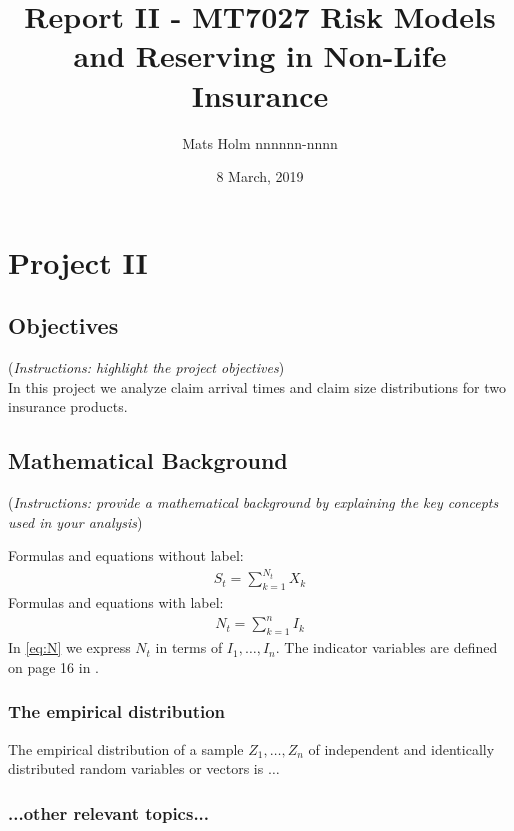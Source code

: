 \documentclass[11pt]{article}
\title{Report II - MT7027 Risk Models and Reserving in Non-Life Insurance}
\author{Mats Holm nnnnnn-nnnn }
\date{8 March, 2019}                                           %
\begin{document}
\maketitle
\section*{Project II}
\subsection*{Objectives}
({\it Instructions: highlight the project objectives})
\\
In this project we analyze claim
arrival times and claim size distributions for two insurance products.

\subsection*{Mathematical Background}
({\it Instructions: provide a mathematical background by explaining the key concepts used in your analysis})

Formulas and equations without label:
\begin{align*}
	S_t = \sum_{k=1}^{N_t} X_k
\end{align*}
Formulas and equations with label:
\begin{align}\label{eq:N}
	N_t = \sum_{k=1}^{n} I_k
\end{align}
In \eqref{eq:N} we express $N_t$ in terms of $I_1,\dots,I_n$. The indicator variables are defined on page 16 in \cite{Wuthrich-Merz-13}.

\subsubsection*{The empirical distribution}
The empirical distribution of a sample $Z_1, \dots, Z_n$ of independent and identically distributed random variables or vectors is $\ldots$

\subsubsection*{...other relevant topics...}
\end{document}
